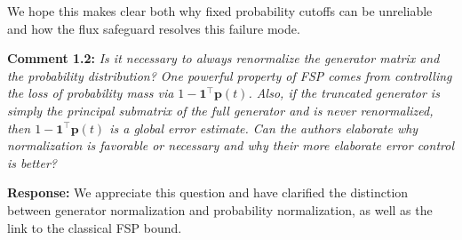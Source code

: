 \documentclass[11pt]{article}
\begin{document}
We hope this makes clear both why fixed probability cutoffs can be unreliable and
how the flux safeguard resolves this failure mode.

\medskip

\noindent\textbf{Comment 1.2:} \textit{Is it necessary to always renormalize the generator matrix and the
probability distribution? One powerful property of FSP comes from controlling
the loss of probability mass via $1-\mathbf{1}^\top\mathbf{p}(t)$. Also, if the
truncated generator is simply the principal submatrix of the full generator and
is never renormalized, then $1-\mathbf{1}^\top\mathbf{p}(t)$ is a global error
estimate. Can the authors elaborate why normalization is favorable or necessary
and why their more elaborate error control is better?}

\textbf{Response:} We appreciate this question and have clarified the distinction
between generator normalization and probability normalization, as well as the link
to the classical FSP bound.
\end{document}
